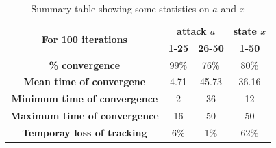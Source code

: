 \begin{table}[h!]
\centering
\begin{tabular}{|c|c|c|c|}
\hline
\multirow{2}{*}{\textbf{For 100 iterations}} & \multicolumn{2}{|c|}{\textbf{attack $a$}} & \multicolumn{1}{|c|}{\textbf{state $x$}} \\
\cline{2-4}
 & \textbf{1-25} & \textbf{26-50} & \textbf{1-50} \\
\hline
\textbf{\% convergence} &99\% &76\% &80\% \\
\hline
\textbf{Mean time of convergene} &4.71 &45.73 &36.16 \\
\hline
\textbf{Minimum time of convergence} &2 &36 &12 \\
\hline
\textbf{Maximum time of convergence} &16 &50 &50 \\
\hline
\textbf{Temporay loss of tracking} &6\% &1\% &62\% \\
\hline
\end{tabular}
\caption{Summary table showing some statistics on $a$ and $x$}
\label{table:5}
\end{table}
    
